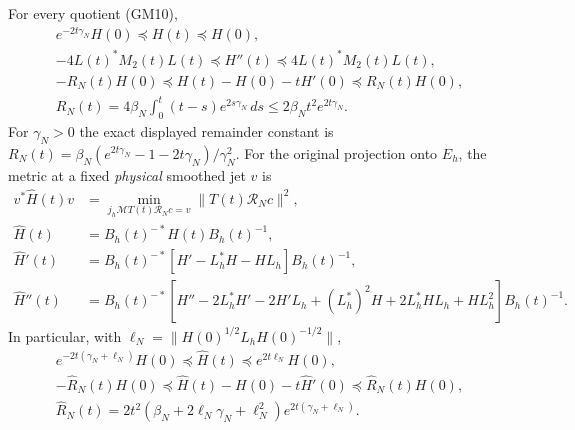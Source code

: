 \begin{theorem}
For every quotient (GM10),
\begin{equation}\tag{GM13}
 \begin{gathered}
 e^{-2t\gamma_N}H(0)\preceq H(t)\preceq H(0),\\
 -4L(t)^*M_2(t)L(t)\preceq H''(t)
                     \preceq4L(t)^*M_2(t)L(t),\\
 -R_N(t)H(0)\preceq H(t)-H(0)-tH'(0)\preceq R_N(t)H(0),\\
 R_N(t)=4\beta_N\int_0^t(t-s)e^{2s\gamma_N}\,ds
 \leq2\beta_Nt^2e^{2t\gamma_N}.
 \end{gathered}
\end{equation}
For $\gamma_N>0$ the exact displayed remainder constant is
$R_N(t)=\beta_N(e^{2t\gamma_N}-1-2t\gamma_N)/\gamma_N^2$.
For the original projection onto $E_h$, the metric at a fixed
\emph{physical} smoothed jet $v$ is
\begin{equation}\tag{GM14}
 \begin{split}
 v^*\widehat H(t)v
 &=\min_{j_h\mathcal M T(t)\mathcal R_Nc=v}
                  \|T(t)\mathcal R_Nc\|^2,\\
 \widehat H(t)&=B_h(t)^{-*}H(t)B_h(t)^{-1},\\
 \widehat H'(t)&=B_h(t)^{-*}
       [H'-L_h^*H-HL_h]B_h(t)^{-1},\\
 \widehat H''(t)&=B_h(t)^{-*}
       [H''-2L_h^*H'-2H'L_h+(L_h^*)^2H
                    +2L_h^*HL_h+HL_h^2]B_h(t)^{-1}.
 \end{split}
\end{equation}
In particular, with $\ell_N=\|H(0)^{1/2}L_hH(0)^{-1/2}\|$,
\begin{equation}\tag{GM15}
 \begin{gathered}
 e^{-2t(\gamma_N+\ell_N)}H(0)
       \preceq\widehat H(t)\preceq e^{2t\ell_N}H(0),\\
 -\widehat R_N(t)H(0)
 \preceq\widehat H(t)-H(0)-t\widehat H'(0)
 \preceq\widehat R_N(t)H(0),\\
 \widehat R_N(t)=2t^2
       (\beta_N+2\ell_N\gamma_N+\ell_N^2)
                     e^{2t(\gamma_N+\ell_N)}.
 \end{gathered}
\end{equation}
\end{theorem}
